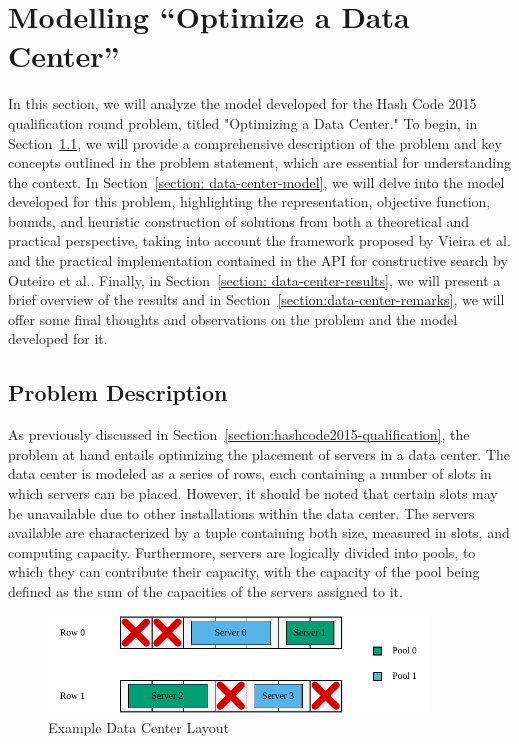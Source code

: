 \section{Modelling ``Optimize a Data Center''} \label{section:data-center}

In this section, we will analyze the model developed for the Hash Code 2015
qualification round problem, titled "Optimizing a Data Center." To begin, in
Section~\ref{section:data-center-problem}, we will provide a comprehensive
description of the problem and key concepts outlined in the problem statement,
which are essential for understanding the context. In Section~\ref{section:
  data-center-model}, we will delve into the model developed for this problem,
highlighting the representation, objective function, bounds, and heuristic
construction of solutions from both a theoretical and practical perspective,
taking into account the framework proposed by Vieira et al.\cite{vieira2009uma}
and the practical implementation contained in the API for constructive search by
Outeiro et al.\cite{outeiro2021application}. Finally, in Section~\ref{section:
  data-center-results}, we will present a brief overview of the results and in
Section~\ref{section:data-center-remarks}, we will offer some final thoughts and
observations on the problem and the model developed for it.

\subsection{Problem Description} \label{section:data-center-problem}

As previously discussed in Section~\ref{section:hashcode2015-qualification},
the problem at hand entails optimizing the placement of servers in a data center.
The data center is modeled as a series of rows, each containing a number of
slots in which servers can be placed. However, it should be noted that certain
slots may be unavailable due to other installations within the data center. The
servers available are characterized by a tuple containing both size, measured in
slots, and computing capacity. Furthermore, servers are logically divided into
pools, to which they can contribute their capacity, with the capacity of the
pool being defined as the sum of the capacities of the servers assigned to it.

\begin{figure}[h] \centering \includegraphics[width=0.9\textwidth,
    keepaspectratio]{../assets/dc/dc-example.pdf} \caption{Example Data Center
    Layout} \label{fig:data-center-layout} \end{figure}

